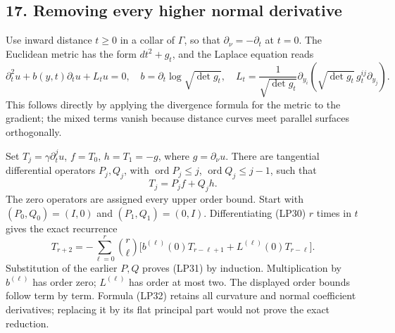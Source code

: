 \documentclass[
  11pt,
]{article}
\makeatletter
\let\ReaderOriginalAnchorStart\hyper@anchorstart
\let\ReaderOriginalAnchorEnd\hyper@anchorend
\let\ReaderPendingAliases\@empty
\def\ReaderArmAliases#1{\gdef\ReaderPendingAliases{#1}}
\def\hyper@anchorstart#1{\ReaderIfNativeAnchorTF{#1}{\ReaderPendingAliases\global\let\ReaderPendingAliases\@empty}{}\ReaderOriginalAnchorStart{#1}}
\makeatother
\begin{document}
\ReaderArmAliases{\ReaderOriginalAnchorStart{AN03-SBD-017}\ReaderOriginalAnchorEnd\begingroup\expandafter\def\csname @currentHref\endcsname{AN03-SBD-017}\label{AN03-SBD-017}\endgroup\ReaderOriginalAnchorStart{an03-sbd-017-removing-every-higher-normal-derivative}\ReaderOriginalAnchorEnd\begingroup\expandafter\def\csname @currentHref\endcsname{an03-sbd-017-removing-every-higher-normal-derivative}\label{an03-sbd-017-removing-every-higher-normal-derivative}\endgroup\ReaderOriginalAnchorStart{17-removing-every-higher-normal-derivative}\ReaderOriginalAnchorEnd\begingroup\expandafter\def\csname @currentHref\endcsname{17-removing-every-higher-normal-derivative}\label{17-removing-every-higher-normal-derivative}\endgroup\ReaderOriginalAnchorStart{removing-every-higher-normal-derivative}\ReaderOriginalAnchorEnd}
\subsection{17. Removing every higher normal
derivative}\label{removing-every-higher-normal-derivative}

Use inward distance \(t\ge0\) in a collar of \(\Gamma\), so that
\(\partial_\nu=-\partial_t\) at \(t=0\). The Euclidean metric has the
form \(dt^2+g_t\), and the Laplace equation reads \[
 \partial_t^2u+b(y,t)\partial_tu+L_tu=0,
 \quad b=\partial_t\log\sqrt{\det g_t},\quad
 L_t=\frac1{\sqrt{\det g_t}}\partial_{y_i}
       (\sqrt{\det g_t}\,g_t^{ij}\partial_{y_j}).
 \tag{LP30}
\] This follows directly by applying the divergence formula for the
metric to the gradient; the mixed terms vanish because distance curves
meet parallel surfaces orthogonally.

Set \(T_j=\gamma\partial_t^ju\), \(f=T_0\), \(h=T_1=-g\), where
\(g=\partial_\nu u\). There are tangential differential operators
\(P_j,Q_j\), with \(\operatorname{ord}P_j\le j\),
\(\operatorname{ord}Q_j\le j-1\), such that \[
 T_j=P_j f+Q_jh.
 \tag{LP31}
\] The zero operators are assigned every upper order bound. Start with
\((P_0,Q_0)=(I,0)\) and \((P_1,Q_1)=(0,I)\). Differentiating (LP30)
\(r\) times in \(t\) gives the exact recurrence \[
 T_{r+2}=-\sum_{\ell=0}^r\binom r\ell
 \big[b^{(\ell)}(0)T_{r-\ell+1}
       +L^{(\ell)}(0)T_{r-\ell}\big].
 \tag{LP32}
\] Substitution of the earlier \(P,Q\) proves (LP31) by induction.
Multiplication by \(b^{(\ell)}\) has order zero; \(L^{(\ell)}\) has
order at most two. The displayed order bounds follow term by term.
Formula (LP32) retains all curvature and normal coefficient derivatives;
replacing it by its flat principal part would not prove the exact
reduction.
\end{document}

